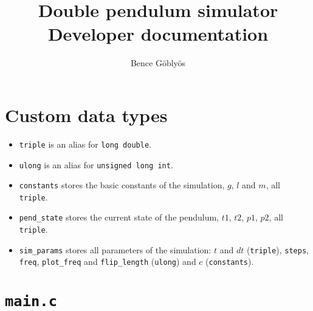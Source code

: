 \documentclass[a4paper,10pt]{article}
\title{Double pendulum simulator\\Developer documentation}
\author{Bence Göblyös}
\begin{document}
\maketitle
\newpage
{}

\section{Custom data types}
\begin{itemize}
 \item \texttt{triple} is an alias for \texttt{long double}.
 \item \texttt{ulong} is an alias for \texttt{unsigned long int}.
 \item \texttt{constants} stores the basic constants of the simulation, $g$, $l$ and $m$, all \texttt{triple}.
 \item \texttt{pend\_state} stores the current state of the pendulum, $t1$, $t2$, $p1$, $p2$,
 all \texttt{triple}.
 \item \texttt{sim\_params} stores all parameters of the simulation: $t$ and $dt$ (\texttt{triple}),
 \texttt{steps}, \texttt{freq}, \texttt{plot\_freq} and \texttt{flip\_length} (\texttt{ulong}) and
 $c$ (\texttt{constants}).
\end{itemize}

\section{\texttt{main.c}}
\end{document}
